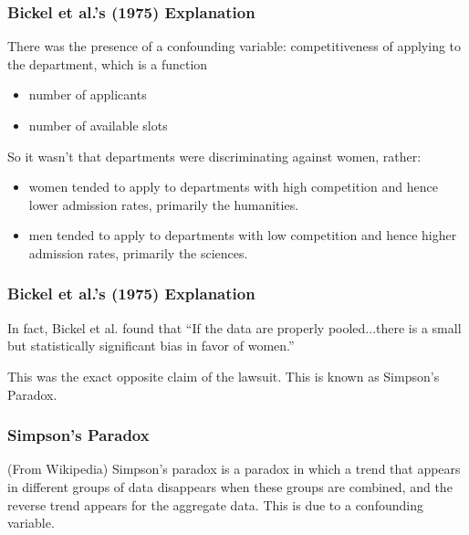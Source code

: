 \documentclass[slides]{beamer}\usepackage[]{graphicx}\usepackage[]{color}
\newcommand{\blue}[1]{\textcolor{blue2}{#1}}
\begin{document}
\begin{frame}
\frametitle{Bickel et al.'s (1975) Explanation}

There was the presence of a confounding variable: \blue{competitiveness} of applying to the department, which is a function
\begin{itemize}
\item number of applicants
\item number of available slots
\end{itemize}

\vskip 0.5cm

\pause So it wasn't that departments were discriminating against women, rather:
\begin{itemize}
\pause \item women tended to apply to departments with high competition and hence lower admission rates, primarily the humanities.
\pause \item men tended to apply to departments with low competition and hence higher admission rates, primarily the sciences.
\end{itemize}

\end{frame}


\begin{frame}
\frametitle{Bickel et al.'s (1975) Explanation}

In fact, Bickel et al. found that ``If the data are properly \blue{pooled}...there is a small but statistically significant bias in \blue{favor of women}.''

\vskip 0.5cm

\pause This was the exact \blue{opposite} claim of the lawsuit.  This is known as \blue{Simpson's Paradox}.  

\end{frame}



\begin{frame}
\frametitle{Simpson's Paradox}

(From Wikipedia) Simpson's paradox is a paradox in which a trend that appears in different groups of data disappears when these groups are combined, and the \blue{reverse trend} appears for the aggregate data.  This is due to a confounding variable.

\end{frame}
\end{document}
